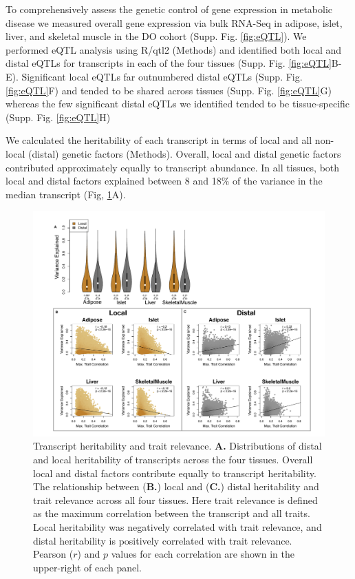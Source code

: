 \documentclass[
]{article}
\begin{document}
To comprehensively assess the genetic control of gene expression in
metabolic disease we measured overall gene expression via bulk RNA-Seq
in adipose, islet, liver, and skeletal muscle in the DO cohort (Supp.
Fig. \ref{fig:eQTL}). We performed eQTL analysis using R/qtl2
\cite{pmid30591514} (Methods) and identified both local and distal eQTLs
for transcripts in each of the four tissues (Supp. Fig.
\ref{fig:eQTL}B-E). Significant local eQTLs far outnumbered distal eQTLs
(Supp. Fig. \ref{fig:eQTL}F) and tended to be shared across tissues
(Supp. Fig. \ref{fig:eQTL}G) whereas the few significant distal eQTLs we
identified tended to be tissue-specific (Supp. Fig. \ref{fig:eQTL}H)

We calculated the heritability of each transcript in terms of local and
all non-local (distal) genetic factors (Methods). Overall, local and
distal genetic factors contributed approximately equally to transcript
abundance. In all tissues, both local and distal factors explained
between 8 and 18\% of the variance in the median transcript (Fig,
\ref{fig:motivation}A).

\begin{figure}[ht!]
\includegraphics[width=\textwidth]{Figures/Fig2_motivation.pdf} 
\caption{Transcript heritability and trait relevance. 
\textbf{A.} Distributions of distal and local heritability of 
transcripts across the four tissues. Overall local and distal 
factors contribute equally to transcript heritability. The 
relationship between (\textbf{B.}) local and (\textbf{C.}) 
distal heritability and trait relevance across all four tissues. 
Here trait relevance is defined as the maximum correlation between 
the transcript and all traits. Local heritability was negatively 
correlated with trait relevance, and distal heritability is 
positively correlated with trait relevance. Pearson ($r$) and $p$ 
values for each correlation are shown in the upper-right of each panel.}
\label{fig:motivation}
\end{figure}
\end{document}

